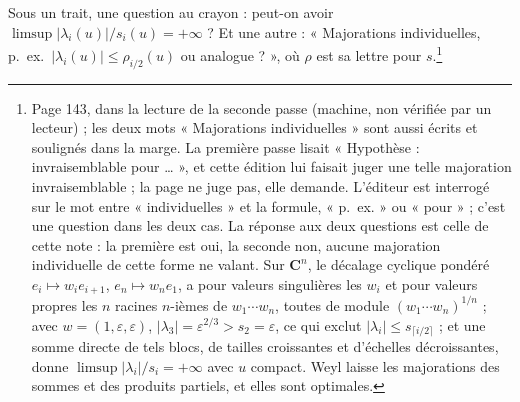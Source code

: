 \documentclass[11pt,a4paper]{article}
\begin{document}
Sous un trait, une question au crayon : peut-on avoir $\limsup
|\lambda_i(u)|/s_i(u) = +\infty$ ? Et une autre : « Majorations
individuelles, p.\ ex.\ $|\lambda_i(u)| \leq \rho_{i/2}(u)$ ou analogue
? », où $\rho$ est sa lettre pour $s$.\footnote{Page 143, dans la lecture de la seconde passe (machine, non
vérifiée par un lecteur) ; les deux mots « Majorations individuelles » sont
aussi écrits et soulignés dans la marge. La première passe lisait
« Hypothèse : invraisemblable pour … », et cette édition lui faisait juger
une telle majoration invraisemblable ; la page ne juge pas, elle demande.
L'éditeur est interrogé sur le mot entre « individuelles » et la formule,
« p.\ ex. » ou « pour » ; c'est une question dans les deux cas. La réponse
aux deux questions est celle de cette note : la première est oui, la seconde
non, aucune majoration individuelle de cette forme ne valant. Sur $\mathbf{C}^n$, le décalage cyclique pondéré $e_i \mapsto w_i e_{i+1}$,
$e_n \mapsto w_n e_1$, a pour valeurs singulières les $w_i$ et pour valeurs
propres les $n$ racines $n$-ièmes de $w_1 \cdots w_n$, toutes de module
$(w_1 \cdots w_n)^{1/n}$ ; avec $w = (1, \varepsilon, \varepsilon)$, $|\lambda_3|
= \varepsilon^{2/3} > s_2 = \varepsilon$, ce qui exclut $|\lambda_i| \leq
s_{\lceil i/2\rceil}$ ; et une somme directe de tels blocs, de tailles
croissantes et d'échelles décroissantes, donne $\limsup |\lambda_i|/s_i =
+\infty$ avec $u$ compact. Weyl laisse les majorations des sommes et des
produits partiels, et elles sont optimales.}
\end{document}

